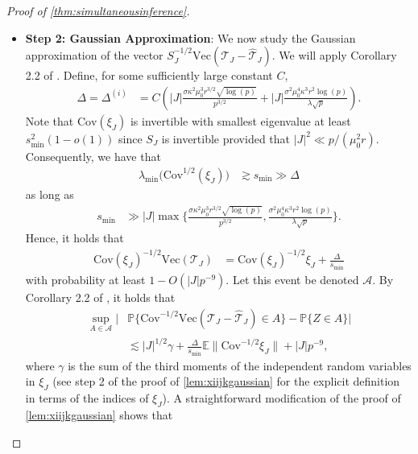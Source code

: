 \documentclass[10pt]{article}
\newcommand{\0}{{\mathbf{0}}}
\newcommand{\1}{{\mathbf{1}}}
\newcommand{\E}{{\mathbf{E}}}
\renewcommand{\citet}{\cite}
\newcommand{\p}{\mathbb{P}}
\renewcommand{\E}{\mathbb{E}}
\renewcommand{\hat}{\widehat}
\renewcommand{\hat}{\widehat}
\begin{document}
\begin{proof}[Proof of \cref{thm:simultaneousinference}]
\begin{itemize}
\begin{align}
    \mathrm{Cov}(\xi_J) &= S_J + O\bigg( \frac{|J|^2\mu_0^2 r}{p} s_{\min}^2 \bigg),\label{Sjapprox}
\end{align}
provided that $s_{\min}^2 \gg \sigma^2 \mu_0^2 r/p$.  
\item \textbf{Step 2: Gaussian Approximation}: We now study the Gaussian approximation of the vector $S_{J}^{-1/2} \mathrm{Vec}(\mathcal{T}_J - \mathcal{\hat T}_J)$.    We will apply Corollary 2.2 of \citet{shao_berryesseen_2022}.  Define, for some sufficiently large constant $C$,
\begin{align*}
    \Delta = \Delta^{(i)} &= C  \left(|J| \frac{\sigma \kappa^2 \mu_{0}^{3} r^{3 / 2} \sqrt{\log (p)}}{p^{3 / 2}}+|J| \frac{\sigma^{2} \mu_{0}^{4} \kappa^{3} r^{2} \log (p)}{\lambda \sqrt{p}}\right).
\end{align*}
Note that $\mathrm{Cov}(\xi_J)$ is invertible with smallest eigenvalue at least $s^2_{\min}(1- o(1))$ since $S_J$ is invertible provided that $|J|^2  \ll p /(\mu_0^2 r)$.  Consequently, we have that
\begin{align*}
    \lambda_{\min}\big( \mathrm{Cov}^{1/2}(\xi_J)\big) &\gtrsim s_{\min} \gg \Delta
\end{align*}
as long as
\begin{align}
    s_{\min} &\gg |J| \max \bigg\{   \frac{\sigma \kappa^2 \mu_{0}^{3} r^{3 / 2} \sqrt{\log (p)}}{p^{3 / 2}}, \frac{\sigma^{2} \mu_{0}^{4} \kappa^{3} r^{2} \log (p)}{\lambda \sqrt{p}}\bigg\}. \label{smin1}
\end{align}
Hence, it holds that
\begin{align*}
    \mathrm{Cov}(\xi_J)^{-1/2}
    \mathrm{Vec}(\mathcal{T}_J) &= \mathrm{Cov}(\xi_J)^{-1/2} \xi_J + \frac{\Delta}{s_{\min}}
\end{align*}
with probability at least $1 - O(|J|p^{-9})$.  Let this event be denoted $\mathcal{A}$.  By Corollary 2.2 of \citet{shao_berryesseen_2022}, it holds that
\begin{align*}
    \sup_{A \in \mathcal{A} } \bigg| &\p\bigg\{ \mathrm{Cov}^{-1/2} \mathrm{Vec}(\mathcal{T}_J - \mathcal{\hat T}_J) \in A \bigg\} - \p\bigg\{ Z \in A \bigg\} \bigg| \\
    &\lesssim |J|^{1/2}\gamma + \frac{\Delta}{s_{\min}} \E \| \mathrm{Cov}^{-1/2}\xi_J \|+ |J|p^{-9}, 
\end{align*}
where $\gamma$ is the sum of the third moments of the independent random variables in $\xi_J$ (see step 2 of the proof of \cref{lem:xiijkgaussian} for the explicit definition in terms of the indices of $\xi_J$).  A straightforward modification of the proof of \cref{lem:xiijkgaussian} shows that

\end{itemize}
\end{proof}
\end{document}
